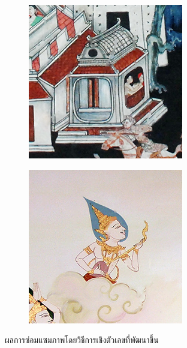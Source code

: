 \begin{figure}[H]
\begin{subfigure}{\ResultSubFigureWidth \linewidth}
    \end{subfigure}
    \begin{subfigure}{\ResultSubFigureWidth \linewidth}
        \centering
        \includegraphics[width=\ResultSubFigurePadding \linewidth]{image/result_ex4/multisplitbergman_case04.png}			
    \end{subfigure}
    \begin{subfigure}{\ResultSubFigureWidth \linewidth}
        \centering
        \includegraphics[width=\ResultSubFigurePadding\linewidth]{image/result_ex4/multisplitbergman_case05.png}			
    \end{subfigure}
    \caption{ผลการซ่อมแซมภาพโดยวิธีการเชิงตัวเลขที่พัฒนาขึ้น}
\end{figure}